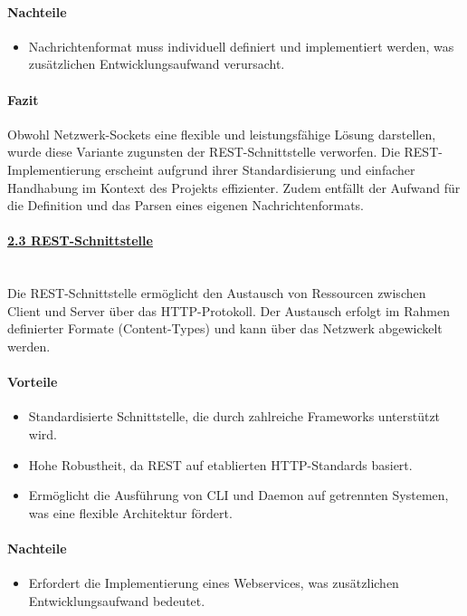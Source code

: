 \documentclass[a4paper,12pt]{report}
\begin{document}
    \paragraph{Nachteile}
    \begin{itemize}
        \item Nachrichtenformat muss individuell definiert und implementiert werden, was zusätzlichen Entwicklungsaufwand verursacht.
    \end{itemize}

    \paragraph{Fazit}
    Obwohl Netzwerk-Sockets eine flexible und leistungsfähige Lösung darstellen, wurde diese Variante zugunsten der REST-Schnittstelle verworfen.
    Die REST-Implementierung erscheint aufgrund ihrer Standardisierung und einfacher Handhabung im Kontext des Projekts effizienter.
    Zudem entfällt der Aufwand für die Definition und das Parsen eines eigenen Nachrichtenformats.

    \paragraph{\underline{2.3 REST-Schnittstelle}}\mbox{}\\
    Die REST-Schnittstelle ermöglicht den Austausch von Ressourcen zwischen Client und Server über das HTTP-Protokoll.
    Der Austausch erfolgt im Rahmen definierter Formate (Content-Types) und kann über das Netzwerk abgewickelt werden.

    \paragraph{Vorteile}
    \begin{itemize}
        \item Standardisierte Schnittstelle, die durch zahlreiche Frameworks unterstützt wird.
        \item Hohe Robustheit, da REST auf etablierten HTTP-Standards basiert.
        \item Ermöglicht die Ausführung von CLI und Daemon auf getrennten Systemen, was eine flexible Architektur fördert.
    \end{itemize}

    \paragraph{Nachteile}
    \begin{itemize}
        \item Erfordert die Implementierung eines Webservices, was zusätzlichen Entwicklungsaufwand bedeutet.
    \end{itemize}
\end{document}
